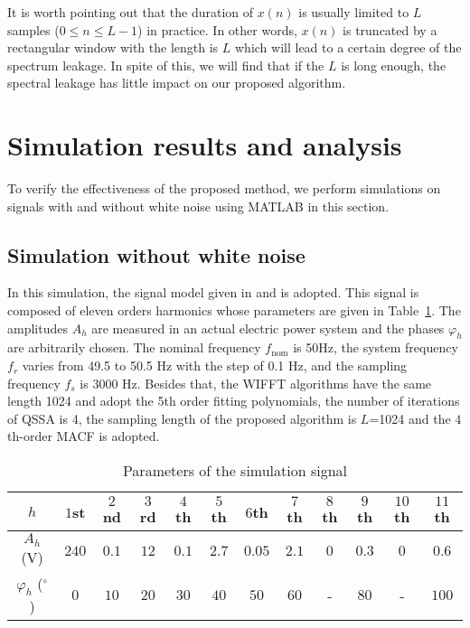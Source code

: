 \documentclass[journal,twoside]{IEEEtran}
\begin{document}
It is worth pointing out that the duration of $x(n)$ is usually limited to $L$ samples ($0\leqslant n\leqslant L-1$) in practice. In other words, $x(n)$ is truncated by a rectangular window with the length is $L$ which will lead to a certain degree of the spectrum leakage. In spite of this, we will find that if the $L$ is long enough, the spectral leakage has little impact on our proposed algorithm.

\section{Simulation results and analysis}
To verify the effectiveness of the proposed method, we perform simulations on signals with and without white noise using MATLAB in this section.
\subsection{Simulation without white noise}
In this simulation, the signal model given in \cite{Wen2014} and \cite{Zhang2001} is adopted. This signal is composed of eleven orders harmonics whose parameters are given in Table~\ref{table_1}. The amplitudes $A_h$ are measured in an actual electric power system and the phases $\varphi_h$ are arbitrarily chosen. The nominal frequency $f_\mathrm{nom}$ is 50Hz, the system frequency $f_r$ varies from 49.5 to 50.5 Hz with the step of 0.1 Hz, and the sampling frequency $f_s$ is 3000 Hz. Besides that, the WIFFT algorithms have the same length 1024 and adopt the 5th order fitting polynomials, the number of iterations of QSSA is 4, the sampling length of the proposed algorithm is $L$=1024 and the $4$th-order MACF is adopted.

\begin{table}
	\renewcommand{\arraystretch}{1.3}
	\caption{Parameters of the simulation signal}
	\label{table_1}
	\centering
	\begin{tabular}{@{ }c@{ }@{ }c@{ }@{ }c@{ }@{ }c@{ }@{ }c@{ }@{ }c@{ }@{ }c@{ }@{ }c@{ }@{ }c@{ }@{ }c@{ }@{ }c@{ }@{ }c@{ }}
		\toprule
		$h$ & $1$st & $2$nd & $3$rd & $4$th & $5$th & $6$th & $7$th & $8$th & $9$th & $10$th & $11$th \\
		\midrule
		$A_h$ (V) & $240$ & $0.1$ & $12$ & $0.1$ & $2.7$ & $0.05$ & $2.1$ & $0$ & $0.3$ & $0$ & $0.6$ \\
		$\varphi_h$ ($^\circ$) & $0$ & $10$ & $20$ & $30$ & $40$ & $50$ & $60$ & - & $80$ & - & $100$ \\
		\bottomrule
	\end{tabular}
\end{table}
\end{document}
